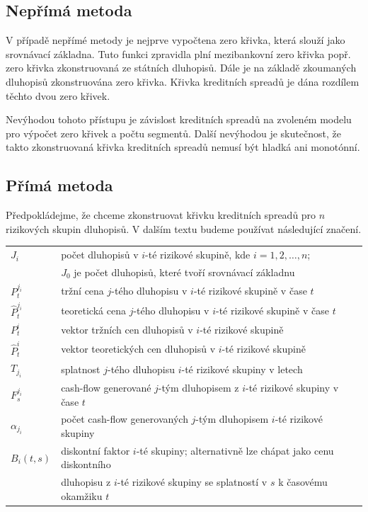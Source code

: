 \documentclass[a4paper]{book}
\begin{document}
\subsection{Nepřímá metoda}

V případě nepřímé metody je nejprve vypočtena zero křivka, která slouží jako srovnávací základna. Tuto funkci zpravidla plní mezibankovní zero křivka popř. zero křivka zkonstruovaná ze státních dluhopisů. Dále je na základě zkoumaných dluhopisů zkonstruována zero křivka. Křivka kreditních spreadů je dána rozdílem těchto dvou zero křivek.

Nevýhodou tohoto přístupu je závislost kreditních spreadů na zvoleném modelu pro výpočet zero křivek a počtu segmentů. Další nevýhodou je skutečnost, že takto zkonstruovaná křivka kreditních spreadů nemusí být hladká ani monotónní.

\subsection{Přímá metoda}

Předpokládejme, že chceme zkonstruovat křivku kreditních spreadů pro $n$ rizikových skupin dluhopisů. V dalším textu budeme používat následující značení.
\begin{center}
\begin{tabular}{l l}
$J_i$ & počet dluhopisů v $i$-té rizikové skupině, kde $i = 1,2, \dots, n$;\\
 & $J_0$ je počet dluhopisů, které tvoří srovnávací základnu\\
$P_t^{j_i}$ & tržní cena $j$-tého dluhopisu v $i$-té rizikové skupině v čase $t$\\
$\hat{P}_t^{j_i}$ & teoretická cena $j$-tého dluhopisu v $i$-té rizikové skupině v čase $t$\\
$P_t^i$ & vektor tržních cen dluhopisů v $i$-té rizikové skupině\\
$\hat{P}_t^i$ & vektor teoretických cen dluhopisů v $i$-té rizikové skupině\\
$T_{j_i}$ & splatnost $j$-tého dluhopisu $i$-té rizikové skupiny v letech\\
$F_s^{j_i}$ & cash-flow generované $j$-tým dluhopisem z $i$-té rizikové skupiny v čase $t$\\
$\alpha_{j_i}$ & počet cash-flow generovaných $j$-tým dluhopisem $i$-té rizikové skupiny\\
$B_i(t,s)$ & diskontní faktor $i$-té skupiny; alternativně lze chápat jako cenu diskontního\\
 & dluhopisu z $i$-té rizikové skupiny se splatností v $s$ k časovému okamžiku $t$
\end{tabular}
\end{center}
\end{document}
